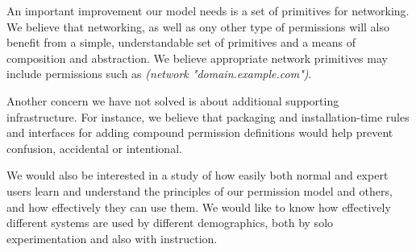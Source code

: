 An important improvement our model needs is a set of primitives for networking.  We believe that networking, as well as ony other type of permissions will also benefit from a simple, understandable set of primitives and a means of composition and abstraction.  We believe appropriate network primitives may include permissions such as \textit{(network "domain.example.com")}.

Another concern we have not solved is about additional supporting infrastructure.  For instance, we believe that packaging and installation-time rules and interfaces for adding compound permission definitions would help prevent confusion, accidental or intentional.

We would also be interested in a study of how easily both normal and expert users learn and understand the principles of our permission model and others, and how effectively they can use them.  
We would like to know how effectively different systems are used by different demographics, both by solo experimentation and also with instruction.




